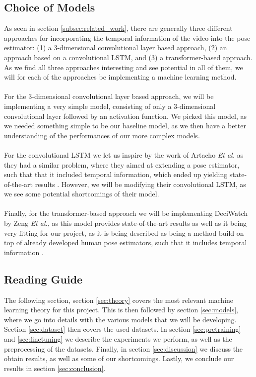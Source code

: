 \documentclass[./main.tex]{subfiles}
\begin{document}
\subsection{Choice of Models}
\label{sec:model_choice}
As seen in section \ref{subsec:related_work}, there are generally three different approaches for incorporating the temporal information of the video into the pose estimator: (1) a 3-dimensional convolutional layer based approach, (2) an approach based on a convolutional LSTM, and (3) a transformer-based approach. As we find all three approaches interesting and see potential in all of them, we will for each of the approaches be implementing a machine learning method.
\\
\\
For the 3-dimensional convolutional layer based approach, we will be implementing a very simple model, consisting of only a 3-dimensional convolutional layer followed by an activation function. We picked this model, as we needed something simple to be our baseline model, as we then have a better understanding of the performances of our more complex models.
\\
\\
For the convolutional LSTM we let us inspire by the work of Artacho \textit{Et al.} as they had a similar problem, where they aimed at extending a pose estimator, such that that it included temporal information, which ended up yielding state-of-the-art results \cite{https://doi.org/10.48550/arxiv.2001.08095}. However, we will be modifying their convolutional LSTM, as we see some potential shortcomings of their model.
\\
\\
Finally, for the transformer-based approach we will be implementing DeciWatch by Zeng \textit{Et al.}, as this model provides state-of-the-art results as well as it being very fitting for our project, as it is being described as being a method build on top of already developed human pose estimators, such that it includes temporal information \cite{https://doi.org/10.48550/arxiv.2203.08713}.

\subsection{Reading Guide}
The following section, section \ref{sec:theory} covers the most relevant machine learning theory for this project. This is then followed by section \ref{sec:models}, where we go into details with the various models that we will be developing. Section \ref{sec:dataset} then covers the used datasets. In section \ref{sec:pretraining} and \ref{sec:finetuning} we describe the experiments we perform, as well as the preprocessing of the datasets. Finally, in section \ref{sec:discussion} we discuss the obtain results, as well as some of our shortcomings. Lastly, we conclude our results in section \ref{sec:conclusion}.
\end{document}
